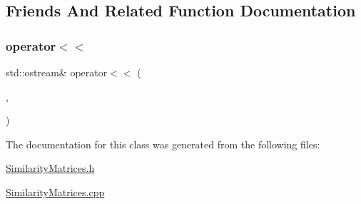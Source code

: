 \subsection{Friends And Related Function Documentation}
\mbox{\label{class_similarity_matrix_a4f66865bdf5054bd8b5840030674e397}} 
\subsubsection{\texorpdfstring{operator$<$$<$}{operator<<}}
{\footnotesize\ttfamily std\+::ostream\& operator$<$$<$ (\begin{DoxyParamCaption}\item[{std\+::ostream \&}]{,  }\item[{const \mbox{\hyperlink{class_similarity_matrix}{Similarity\+Matrix}} \&}]{ }\end{DoxyParamCaption})\hspace{0.3cm}{\ttfamily [friend]}}



The documentation for this class was generated from the following files\+:\begin{DoxyCompactItemize}
\item 
\mbox{\hyperlink{_similarity_matrices_8h}{Similarity\+Matrices.\+h}}\item 
\mbox{\hyperlink{_similarity_matrices_8cpp}{Similarity\+Matrices.\+cpp}}\end{DoxyCompactItemize}
